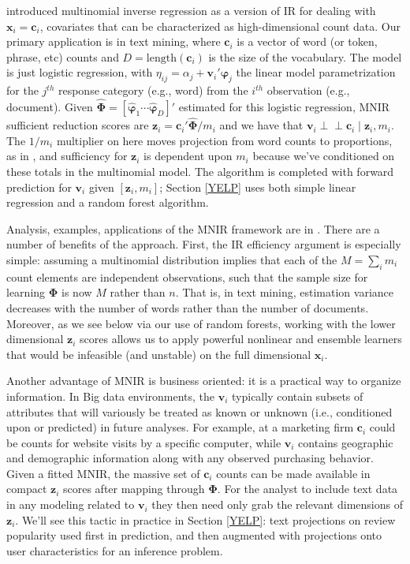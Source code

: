 \documentclass[12pt]{article}
\newcommand{\bs}[1]{\boldsymbol{#1}}
\newcommand{\mr}[1]{\mathrm{#1}}
\newcommand{\bm}[1]{\mathbf{#1}}
\newcommand{\indep}{\perp\!\!\!\perp}
\begin{document}
\cite{taddy_multinomial_2013} introduced multinomial inverse regression 
as a version of IR for dealing with $\bm{x}_i = \bm{c}_i$, covariates that can
be characterized as high-dimensional count data.  Our primary application is
in text mining, where $\bm{c}_i$ is a vector of word (or token, phrase,
etc) counts and $D=\mr{length}(\bm{c}_i)$ is the size of the vocabulary.  The
model is just logistic regression, with $\eta_{ij} = \alpha_j +
\bm{v}_i'\bs{\varphi}_j$ the linear model parametrization for the $j^{th}$
response category (e.g., word) from the $i^{th}$ observation (e.g., document).
Given $\bs{\hat\Phi} = [\bs{\hat\varphi}_1 \cdots \bs{\hat\varphi}_D]'$
estimated for this logistic regression, MNIR sufficient reduction scores are
$\bm{z}_i = \bm{c}_i'\bs{\hat\Phi}/m_i$ and we have that $\bm{v}_i \indep
\bm{c}_i \mid \bm{z}_i, m_i$. The $1/m_i$ multiplier on here moves projection
from word counts to proportions, as in
\cite{taddy_multinomial_2013}, and sufficiency for $\bm{z}_i$ is dependent
upon $m_i$ because we've conditioned on these totals in the 
multinomial model.  The algorithm is completed with forward prediction for $\bm{v}_i$ given $[\bm{z}_i,m_i]$; Section \ref{YELP} uses both simple linear regression and a random forest algorithm.

Analysis, examples, applications of the MNIR framework are in
\cite{taddy_measuring_2013,taddy_multinomial_2013,taddy_rejoinder:_2013}. 
There are a number of benefits of the approach.  First, the IR efficiency
argument is especially simple: assuming a multinomial distribution
implies that each of the $M = \sum_i m_i$ count elements are independent
observations, such that the sample size for learning $\bs{\Phi}$ is now $M$
rather than $n$.  That is, in text mining, estimation variance decreases with
the number of words rather than the number of documents. Moreover,
as we see below via our use of random forests, working with the lower dimensional $\bm{z}_i$ scores allows us to apply powerful nonlinear and ensemble learners that would be infeasible (and unstable) on the full dimensional $\bm{x}_i$.

Another advantage of MNIR is business oriented: it is a practical way to
organize information.  In Big data environments, the $\bm{v}_i$ typically
contain subsets of attributes that will variously be treated as known or
unknown (i.e., conditioned upon or predicted) in future analyses.  For
example, at a marketing firm $\bm{c}_i$ could be counts for website visits by
a specific computer, while $\bm{v}_i$ contains geographic and demographic
information along with any observed purchasing behavior.
Given a fitted MNIR, the massive set of $\bm{c}_i$ counts can be
made available in compact $\bm{z}_i$ scores after mapping through
$\bs{\Phi}$.  For the analyst to include text data in any modeling related to
$\bm{v}_i$ they then need only grab the relevant dimensions of $\bm{z}_i$.
We'll see this tactic in practice in Section \ref{YELP}:  text
projections on review popularity used first in prediction, and then
augmented with projections onto user characteristics for an inference problem.
\end{document}
